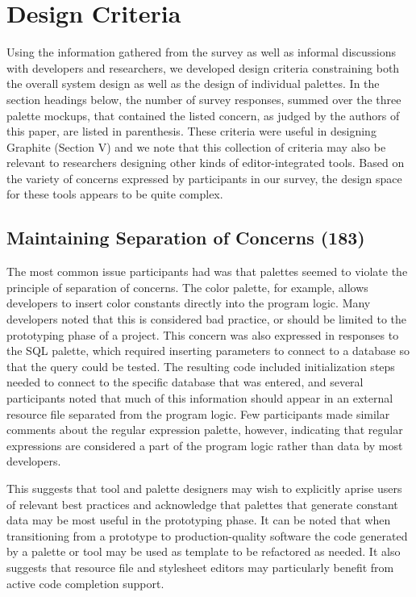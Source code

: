 \documentclass[10pt, conference, compsocconf]{IEEEtran}
\begin{document}
\section{Design Criteria}
Using the information gathered from the survey as well as informal discussions with developers and researchers, we developed  design criteria constraining both the overall system design as well as the design of individual palettes. In the section headings below, the number of survey responses, summed over the three palette mockups, that contained the listed concern, as judged by the authors of this paper, are listed in parenthesis. These criteria were useful in designing Graphite (Section V) and we note that this collection of criteria may also be relevant to researchers designing other kinds of editor-integrated tools. Based on the variety of concerns expressed by participants in our survey, the design space for these tools appears to be quite complex.

\subsection{Maintaining Separation of Concerns (183)}
The most common issue participants had was that palettes seemed to violate the principle of separation of concerns. The color palette, for example, allows developers to insert color constants directly into the program logic. Many developers noted that this is considered bad practice, or should be limited to the prototyping phase of a project. This concern was also expressed in responses to the SQL palette, which required inserting parameters to connect to a database so that the query could be tested. The resulting code included initialization steps needed to connect to the specific database that was entered, and several participants noted that much of this information should appear in an external resource file separated from the program logic. Few participants made similar comments about the regular expression palette, however, indicating that regular expressions are considered a part of the program logic rather than data by most developers.

This suggests that tool and palette designers may wish to explicitly aprise users of relevant best practices and acknowledge that palettes that generate constant data may be most useful in the prototyping phase. It can be noted that when transitioning from a prototype to production-quality software the code generated by a palette or tool may be used as template to be refactored as needed. It also suggests that resource file and stylesheet editors may particularly benefit from active code completion support.
\end{document}
